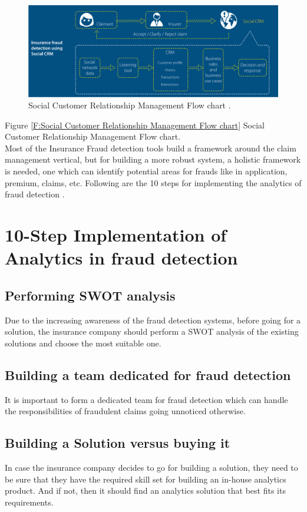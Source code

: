 \documentclass[sigconf]{acmart}
\begin{document}
\begin{figure}
  \includegraphics[width=\linewidth]{images/SCRM_image1.png}
  \caption{Social Customer Relationship Management Flow chart \cite{link7}.}
  \label{F :Social Customer Relationship Management Flow chart}
\end{figure}
Figure \ref{F:Social Customer Relationship Management Flow chart} Social Customer Relationship Management Flow chart.\\

Most of the Insurance Fraud detection tools build a framework around the claim management vertical, but for building a more robust system, a holistic framework is needed, one which can identify potential areas for frauds like in application, premium, claims, etc. Following are the 10 steps for implementing the analytics of fraud detection \cite{link7}.

\section{10-Step Implementation of Analytics in fraud detection}
\subsection{Performing SWOT analysis}
Due to the increasing awareness of the fraud detection systems, before going for a solution, the insurance company should perform a SWOT analysis of the existing solutions and choose the most suitable one.
\subsection{Building a team dedicated for fraud detection}
It is important to form a dedicated team for fraud detection which can handle the responsibilities of fraudulent claims going unnoticed otherwise.
\subsection{Building a Solution versus buying it}
In case the insurance company decides to go for building a solution, they need to be sure that they have the required skill set for building an in-house analytics product. And if not, then it should find an analytics solution that best fits its requirements. 
\end{document}
